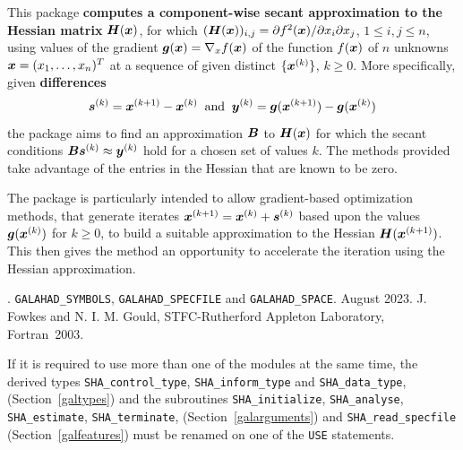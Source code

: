 \documentclass{galahad}
\newcommand{\packagename}{SHA}
\newcommand{\fullpackagename}{\libraryname\_\packagename}
\begin{document}
\galheader


\galsummary
This package
{\bf computes a component-wise secant approximation to the Hessian matrix}
${\bm{H}}({\bm{x}})$, for which
$({\bm{H}}({\bm{x}}))_{i,j} = \partial f^2 ({\bm{x}}) / \partial x_i \partial x_j$,
$1 \leq i, j \leq n$,
using values of the gradient ${\bm{g}}({\bm{x}}) = \nabla_x f({\bm{x}})$
of the function $f({\bm{x}})$ of $n$ unknowns ${\bm{x}} = (x_1, \ldots, x_n)^T$
at a sequence of given distinct $\{{\bm{x}}^{(k)}\}$, $k \geq 0$.
More specifically, given {\bf differences}
\[ {\bm{s}}^{(k)} = {\bm{x}}^{(k+1)} - {\bm{x}}^{(k)} \;\;\mbox{and}\;\;
   {\bm{y}}^{(k)} = {\bm{g}}({\bm{x}}^{(k+1)}) - {\bm{g}}({\bm{x}}^{(k)})
\]
the package aims to find an approximation ${\bm{B}}$ to ${\bm{H}}({\bm{x}})$ for
which the secant conditions ${\bm{B}} {\bm{s}}^{(k)} \approx {\bm{y}}^{(k)}$ hold for
a chosen set of values $k$.
The methods provided take advantage of the entries in the Hessian that
are known to be zero.

The package is particularly intended to allow gradient-based
optimization methods, that generate iterates
${\bm{x}}^{(k+1)} = {\bm{x}}^{(k)} + {\bm{s}}^{(k)}$ based upon the values ${\bm{g}}( {\bm{x}}^{(k)})$
for $k \geq 0$, to build a suitable approximation to the Hessian
${\bm{H}}({\bm{x}}^{(k+1)})$. This then gives the method an opportunity to
accelerate the iteration using the Hessian approximation.


\galattributes
\galversions{\tt  \fullpackagename\_single, \fullpackagename\_double}.
\galuses
{\tt GALAHAD\_SY\-M\-BOLS},
{\tt GALAHAD\_SP\-ECFILE} and
{\tt GALAHAD\_SPACE}.
\galdate August 2023.
\galorigin J. Fowkes and N. I. M. Gould, STFC-Rutherford Appleton Laboratory,
\gallanguage Fortran~2003.


\galhowto



\noindent
If it is required to use more than one of the modules at the same time,
the derived types
{\tt \packagename\_control\_type},
{\tt \packagename\_inform\_type}
and
{\tt \packagename\_data\_type},
(Section~\ref{galtypes})
and the subroutines
{\tt \packagename\_initialize},
{\tt \packagename\_\-analyse},
{\tt \packagename\_\-estimate},
{\tt \packagename\_terminate},
(Section~\ref{galarguments})
and
{\tt \packagename\_read\_specfile}
(Section~\ref{galfeatures})
must be renamed on one of the {\tt USE} statements.
\end{document}
